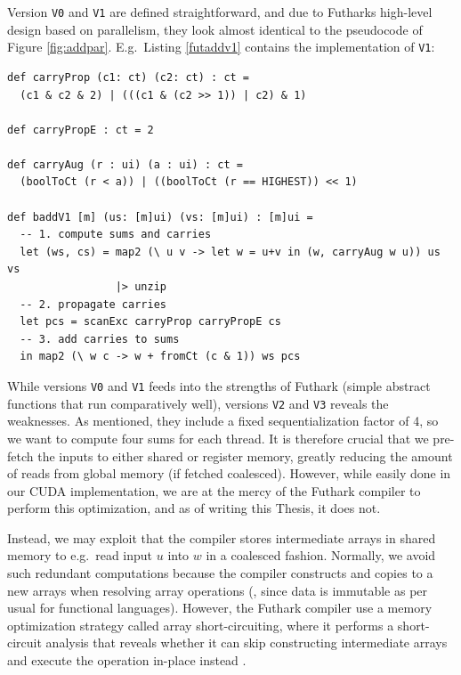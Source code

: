 Version \texttt{V0} and \texttt{V1} are defined straightforward, and due to
Futharks high-level design based on parallelism, they look almost identical to
the pseudocode of Figure \ref{fig:addpar}. E.g.\ Listing \ref{futaddv1} contains
the implementation of \texttt{V1}:
\begin{lstlisting}[language=futhark,caption={\footnotesize Futhark \textit{badd} \texttt{V1} using base \texttt{ui} and carry type \texttt{ct} (from file \texttt{add.fut} slightly edited).},label={futaddv1}]
def carryProp (c1: ct) (c2: ct) : ct =
  (c1 & c2 & 2) | (((c1 & (c2 >> 1)) | c2) & 1)

def carryPropE : ct = 2

def carryAug (r : ui) (a : ui) : ct =
  (boolToCt (r < a)) | ((boolToCt (r == HIGHEST)) << 1)

def baddV1 [m] (us: [m]ui) (vs: [m]ui) : [m]ui =
  -- 1. compute sums and carries
  let (ws, cs) = map2 (\ u v -> let w = u+v in (w, carryAug w u)) us vs
                 |> unzip
  -- 2. propagate carries
  let pcs = scanExc carryProp carryPropE cs
  -- 3. add carries to sums
  in map2 (\ w c -> w + fromCt (c & 1)) ws pcs
\end{lstlisting}

While versions \texttt{V0} and \texttt{V1} feeds into the strengths of Futhark
(simple abstract functions that run comparatively well), versions \texttt{V2} and
\texttt{V3} reveals the weaknesses. As mentioned, they include a fixed
sequentialization factor of 4, so we want to compute four sums for each
thread. It is therefore crucial that we pre-fetch the inputs to either shared or
register memory, greatly reducing the amount of reads from global memory (if
fetched coalesced). However, while easily done in our CUDA implementation, we
are at the mercy of the Futhark compiler to perform this optimization, and as of
writing this Thesis, it does not.

Instead, we may exploit that the compiler stores intermediate arrays in shared
memory to e.g.\ read input $u$ into $w$ in a coalesced fashion. Normally, we
avoid such redundant computations because the compiler constructs and copies to
a new arrays when resolving array operations (, since data is immutable as per
usual for functional languages). However, the Futhark compiler use a memory
optimization strategy called array short-circuiting, where it performs a
short-circuit analysis that reveals whether it can skip constructing
intermediate arrays and execute the operation in-place instead
\cite{futhark/sc22mem}.

